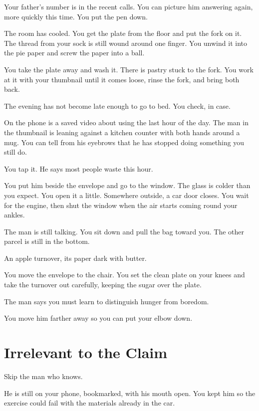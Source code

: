 \documentclass[11pt,oneside]{book}
\begin{document}
Your father's number is in the recent calls. You can picture him answering again, more quickly this time. You put the pen down.

The room has cooled. You get the plate from the floor and put the fork on it. The thread from your sock is still wound around one finger. You unwind it into the pie paper and screw the paper into a ball.

You take the plate away and wash it. There is pastry stuck to the fork. You work at it with your thumbnail until it comes loose, rinse the fork, and bring both back.

The evening has not become late enough to go to bed. You check, in case.

On the phone is a saved video about using the last hour of the day. The man in the thumbnail is leaning against a kitchen counter with both hands around a mug. You can tell from his eyebrows that he has stopped doing something you still do.

You tap it. He says most people waste this hour.

You put him beside the envelope and go to the window. The glass is colder than you expect. You open it a little. Somewhere outside, a car door closes. You wait for the engine, then shut the window when the air starts coming round your ankles.

The man is still talking. You sit down and pull the bag toward you. The other parcel is still in the bottom.

An apple turnover, its paper dark with butter.

You move the envelope to the chair. You set the clean plate on your knees and take the turnover out carefully, keeping the sugar over the plate.

The man says you must learn to distinguish hunger from boredom.

You move him farther away so you can put your elbow down.

\chapter*{Irrelevant to the Claim}

Skip the man who knows.

He is still on your phone, bookmarked, with his mouth open. You kept him so the exercise could fail with the materials already in the car.
\end{document}
